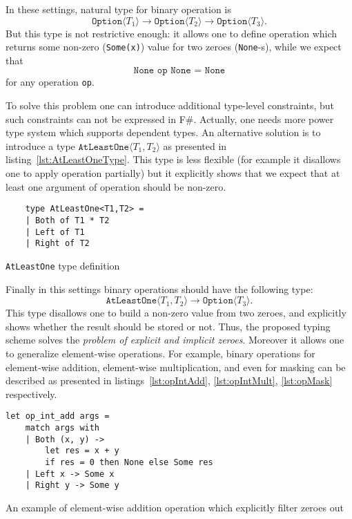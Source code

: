 In these settings, natural type for binary operation is $$\texttt{Option}\langle T_1 \rangle \to \texttt{Option}\langle T_2 \rangle \to \texttt{Option}\langle T_3 \rangle.$$ But this type is not restrictive enough: it allows one to define operation which returns some non-zero (\texttt{Some(x)}) value for two zeroes (\texttt{None}-s), while we expect that $$\texttt{None op None = None}$$ for any operation \texttt{op}.  

To solve this problem one can introduce additional type-level constraints, but such constraints can not be expressed in F\#.
Actually, one needs more power type system which supports dependent types.
An alternative solution is to introduce a type $\texttt{AtLeastOne} \langle T_1, T_2 \rangle$ as presented in listing~\ref{lst:AtLeastOneType}. This type is less flexible (for example it disallows one to apply operation partially) but it explicitly shows that we expect that at least one argument of operation should be non-zero.

\begin{listing}[h]
    \begin{verbatim}
    type AtLeastOne<T1,T2> =
    | Both of T1 * T2
    | Left of T1
    | Right of T2
    \end{verbatim}
    \caption{\texttt{AtLeastOne} type definition}
    \label{lst:AtLeastOneType}
\end{listing}

Finally in this settings binary operations should have the following type: $$\texttt{AtLeastOne} \langle T_1, T_2 \rangle \to \texttt{Option}\langle T_3 \rangle.$$
This type disallows one to build a non-zero value from two zeroes, and explicitly shows whether the result should be stored or not.
Thus, the proposed typing scheme solves the \textit{problem of explicit and implicit zeroes}.
Moreover it allows one to generalize element-wise operations.
For example, binary operations for element-wise addition, element-wise multiplication, and even for masking can be described as presented in listings~\ref{lst:opIntAdd}, \ref{lst:opIntMult}, \ref{lst:opMask} respectively.

\begin{listing}[h]
    \begin{verbatim}
let op_int_add args =
    match args with
    | Both (x, y) -> 
        let res = x + y 
        if res = 0 then None else Some res 
    | Left x -> Some x
    | Right y -> Some y
    \end{verbatim}
    \caption{An example of element-wise addition operation which explicitly filter zeroes out}
    \label{lst:opIntAdd}
\end{listing}


